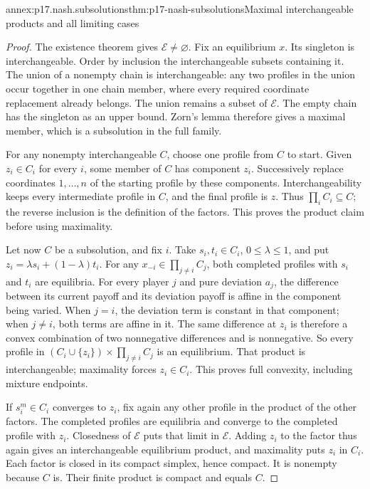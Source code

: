 \begin{annexitem}{annex:p17.nash.subsolutions}{thm:p17-nash-subsolutions}{Maximal interchangeable products and all limiting cases}
\begin{proof}
The existence theorem gives \(\mathcal E\ne\varnothing\).
Fix an equilibrium \(x\). Its singleton is interchangeable.
Order by inclusion the interchangeable subsets containing it.
The union of a nonempty chain is interchangeable: any two
profiles in the union occur together in one chain member,
where every required coordinate replacement already belongs.
The union remains a subset of \(\mathcal E\).
The empty chain has the singleton as an upper bound.
Zorn's lemma therefore gives a maximal member, which is
a subsolution in the full family.

For any nonempty interchangeable \(C\), choose one profile
from \(C\) to start. Given \(z_i\in C_i\) for every \(i\),
some member of \(C\) has component \(z_i\).
Successively replace coordinates \(1,\ldots,n\) of the
starting profile by these components.
Interchangeability keeps every intermediate profile in
\(C\), and the final profile is \(z\).
Thus \(\prod_iC_i\subseteq C\); the reverse inclusion
is the definition of the factors. This proves the product
claim before using maximality.

Let now \(C\) be a subsolution, and fix \(i\).
Take \(s_i,t_i\in C_i\), \(0\leq\lambda\leq1\), and
put \(z_i=\lambda s_i+(1-\lambda)t_i\).
For any \(x_{-i}\in\prod_{j\ne i}C_j\), both completed
profiles with \(s_i\) and \(t_i\) are equilibria.
For every player \(j\) and pure deviation \(a_j\),
the difference between its current payoff and its
deviation payoff is affine in the component being
varied. When \(j=i\), the deviation term is constant
in that component; when \(j\ne i\), both terms
are affine in it. The same difference at \(z_i\)
is therefore a convex combination of two nonnegative
differences and is nonnegative.
So every profile in
\((C_i\cup\{z_i\})\times\prod_{j\ne i}C_j\)
is an equilibrium. That product is interchangeable;
maximality forces \(z_i\in C_i\). This proves full
convexity, including mixture endpoints.

If \(s_i^m\in C_i\) converges to \(z_i\), fix again
any other profile in the product of the other
factors. The completed profiles are equilibria
and converge to the completed profile with \(z_i\).
Closedness of \(\mathcal E\) puts that limit in
\(\mathcal E\). Adding \(z_i\) to the factor thus
again gives an interchangeable equilibrium product,
and maximality puts \(z_i\) in \(C_i\).
Each factor is closed in its compact simplex,
hence compact. It is nonempty because \(C\) is.
Their finite product is compact and equals \(C\).


\end{proof}
\end{annexitem}
